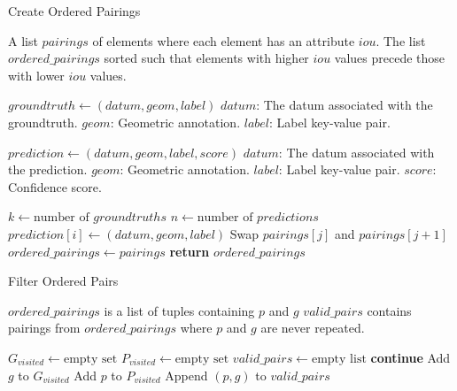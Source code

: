 \documentclass{article}
\begin{document}
\begin{algorithm}
\caption{Create Ordered Pairings}
\label{alg:orderPairings}
\begin{algorithmic}

\Require A list $pairings$ of elements where each element has an attribute $iou$.
\Ensure The list $ordered\_pairings$ sorted such that elements with higher $iou$ values precede those with lower $iou$ values.

\State $groundtruth \gets (datum, geom, label)$
\State \hspace{\algorithmicindent} $datum$: The datum associated with the groundtruth.
\State \hspace{\algorithmicindent} $geom$: Geometric annotation.
\State \hspace{\algorithmicindent} $label$: Label key-value pair.

\State $prediction \gets (datum, geom, label, score)$
\State \hspace{\algorithmicindent} $datum$: The datum associated with the prediction.
\State \hspace{\algorithmicindent} $geom$: Geometric annotation.
\State \hspace{\algorithmicindent} $label$: Label key-value pair.
\State \hspace{\algorithmicindent} $score$: Confidence score.


    \State $k \gets \text{number of } groundtruths$
    \State $n \gets \text{number of } predictions$
        \State $prediction[i] \gets (datum, geom, label)$
                \State Swap $pairings[j]$ and $pairings[j+1]$
            \EndIf
        \EndFor
    \EndFor
    \State $ordered\_pairings \gets pairings$
    \State \textbf{return} $ordered\_pairings$
\EndProcedure


\end{algorithmic}
\end{algorithm}

\begin{algorithm}
\caption{Filter Ordered Pairs}
\label{alg:uniquePairings}
\begin{algorithmic}

\Require $ordered\_pairings$ is a list of tuples containing $p$ and $g$
\Ensure $valid\_pairs$ contains pairings from $ordered\_pairings$ where $p$ and $g$ are never repeated.

\State $G_{visited} \gets \text{empty set}$
\State $P_{visited} \gets \text{empty set}$
\State $valid\_pairs \gets \text{empty list}$
        \State \textbf{continue}
    \Else
        \State Add $g$ to $G_{visited}$
        \State Add $p$ to $P_{visited}$
        \State Append $(p,g)$ to $valid\_pairs$
    \EndIf
\EndFor
\end{algorithmic}
\end{algorithm}
\end{document}
